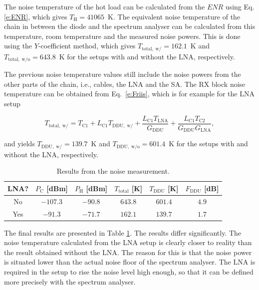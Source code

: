 \documentclass[a4paper, 12pt]{article}
\begin{document}
The noise temperature of the hot load can be calculated from the $\mathit{ENR}$ using Eq. \ref{e:ENR}, which 
gives $T_\mathrm{H} = 41065$~K. The equivalent noise temperature of the chain in between the diode and 
the spectrum analyser can be calculated from this temperature, room temperature and the measured 
noise powers. This is done using the $Y$-coefficient method, which gives $T_{\mathrm{total,\;w/}} = 162.1$~K 
and $T_{\mathrm{total,\;w/o}} = 643.8$~K for the setups with and without the LNA, respectively.

The previous noise temperature values still include the noise powers from the other parts of the 
chain, i.e., cables, the LNA and the SA. The RX block noise temperature can be obtained from Eq.~\ref{e:Friis},
which is for example for the LNA setup

\begin{equation}
T_\mathrm{total,\;w/} = T_\mathrm{C1} + L_\mathrm{C1} T_\mathrm{DDU,\;w/} + \frac{L_\mathrm{C1} T_\mathrm{LNA}}{G_\mathrm{DDU}} + \frac{L_\mathrm{C1} T_\mathrm{C2}}{G_\mathrm{DDU} G_\mathrm{LNA}},
\end{equation}

\noindent
and yields $T_{\mathrm{DDU,\;w/}} = 139.7$~K and $T_{\mathrm{DDU,\;w/o}} = 601.4$~K for the setups 
with and without the LNA, respectively.

\begin{table}[!h]
	\begin{center}
	\caption{Results from the noise measurement.}
	\label{t:noise}
	\renewcommand*{\arraystretch}{1.2}
	\begin{tabular}{cccccc}
	LNA? 			& $P_\mathrm{C}$ [dBm] 		& $P_\mathrm{H}$ [dBm]	& $T_\mathrm{total}$ [K] 	& $T_\mathrm{DDU}$ [K] 	& $F_\mathrm{DDU}$ [dB] \\
	\hline
	No				& $-107.3$					& $-90.8$				& $643.8$ 							& $601.4$ 						& $4.9$\\
	Yes				& $-91.3$					& $-71.7$				& $162.1$ 							& $139.7$ 						& $1.7$ 	
	\end{tabular}
	\end{center}
	\vspace*{-12pt}
\end{table}


The final results are presented in Table \ref{t:noise}. The results differ significantly. The noise temperature 
calculated from the LNA setup is clearly closer to reality than the result obtained without the LNA. 
The reason for this is that the noise power is situated lower than the actual noise floor of the 
spectrum analyser. The LNA is required in the setup to rise the noise level high enough, so that it 
can be defined more precisely with the spectrum analyser.
\end{document}
